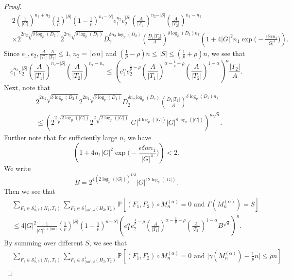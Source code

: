 \documentclass[10pt,a4paper]{amsart}
\newcommand{\Mna}{M_{n}^{(\alpha)}}
\newcommand{\PPP}{\mathbb{P}}
\newcommand{\SSO}[3]{\mathcal{S}^1_{#1}(#2,#3)}
\newcommand{\abs}[1]{\vert#1\vert}
\newcommand{\ceil}[1]{\lceil#1\rceil}
\begin{document}
\begin{proof}
\begin{align*}
&2 (\tfrac{1}{\abs{G}})^{n_1+n_2}
(\tfrac{1}{p})^{\abs{S}}
 (1-\tfrac{1}{p})^{n_1-\abs{S}}
 e_1^{n_2} e_2^{\abs{S}}
 \left(\frac{A}{\abs{T_1}}\right)^{n_2-\abs{S}}
  \left(\frac{A}{\abs{T_2}}\right)^{n_1-n_2}\\
&\times 2^{2n_2\sqrt{\delta\log_p(D_2)}}
2^{2n_1\sqrt{\delta\log_p(D_1)}}
D_2^{\delta n_2\log_p(D_2)}\left(\frac{D_1\abs{T_2}}{A}\right)^{\delta\log_p(D_1) n_1}
\left(1+4\abs{G}^2n_1 \exp\Big(-\frac{\epsilon \delta \alpha n_1}{|G|^4}\Big) \right).
\end{align*}
Since $e_1,e_2,\frac{A}{\abs{T_1}}\frac{A}{\abs{T_2}}\leq 1$, $n_2=\ceil{\alpha n}$ and $(\frac{1}{p}-\rho)n \leq \abs{S}\leq (\frac{1}{p}+\rho)n$, we see that
\[
 e_1^{n_2} e_2^{\abs{S}}
 \left(\frac{A}{\abs{T_1}}\right)^{n_2-\abs{S}}
  \left(\frac{A}{\abs{T_2}}\right)^{n_1-n_2}
  \leq\left(e_1^{\alpha} e_2^{\frac{1}{p}-\rho} \left(\frac{A}{\abs{T_1}}\right)^{\alpha-\frac{1}{p}-\rho} \left(\frac{A}{\abs{T_2}}\right)^{1-\alpha} \right)^n \frac{\abs{T_2}}{A}.
\]
Next, note that
\begin{align*}
&2^{2n_2\sqrt{\delta\log_p(D_2)}}
2^{2n_1\sqrt{\delta\log_p(D_1)}}
D_2^{\delta n_2\log_p(D_2)}
\left(\frac{D_1\abs{T_2}}{A}\right)^{\delta\log_p(D_1) n_1}\\
&\leq 
\left(
2^{2\sqrt{2\log_p(\abs{G})}}
2^{2\sqrt{2\log_p(\abs{G})}}
\abs{G}^{4\log_p(\abs{G})}
\abs{G}^{8\log_p(\abs{G})}
\right)^{n\sqrt{\delta}}.
\end{align*}
Further note that for sufficiently large $n$, we have
\[
\left(1+4n_1\abs{G}^2\exp\Big(-\frac{\epsilon\delta \alpha n_1}{|G|^4}\Big)\right)
<2.
\]
We write
\[
B=2^{4(2\log_p(\abs{G}))^{1/2}}
\abs{G}^{12\log_p(\abs{G})}.
\]
Then we see that
\begin{align*}
&\sum_{F_1\in \SSO{n,\delta}{H_1}{T_1}}
\sum_{F_2\in \SSO{\ceil{\alpha n},\delta}{H_2}{T_2}}
\PPP[(F_1,F_2)\circ \Mna=0 \text{ and } \Gamma(\Mna)=S]\\
&\leq 4\abs{G}^2
\frac{1}{\abs{G}^{n+\ceil{\alpha n}}}
(\tfrac{1}{p})^{\abs{S}}  
(1-\tfrac{1}{p})^{n-\abs{S}}
\left(
e_1^{\alpha} e_2^{\frac{1}{p}-\rho}
\left(\frac{A}{\abs{T_1}}\right)^{\alpha-\frac{1}{p}-\rho}
\left(\frac{A}{\abs{T_2}}\right)^{1-\alpha}
B^{\sqrt{\delta}}
\right)^n.
\end{align*}
By summing over different $S$, we see that
\begin{align*}
&\sum_{F_1\in \SSO{n,\delta}{H_1}{T_1}}
\sum_{F_2\in \SSO{\ceil{\alpha n},\delta}{H_2}{T_2}}
\PPP[(F_1,F_2)\circ \Mna=0 \text{ and } \abs{\gamma(\Mna)-\tfrac{1}{p}n} \leq \rho n]\\

\end{align*}
\end{proof}
\end{document}
